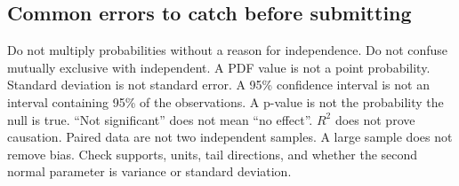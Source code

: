 \subsection*{Common errors to catch before submitting}
Do not multiply probabilities without a reason for independence. Do not
confuse mutually exclusive with independent. A PDF value is not a point
probability. Standard deviation is not standard error. A 95\% confidence
interval is not an interval containing 95\% of the observations. A p-value
is not the probability the null is true. ``Not significant'' does not mean
``no effect''. $R^2$ does not prove causation. Paired data are not two
independent samples. A large sample does not remove bias. Check supports,
units, tail directions, and whether the second normal parameter is variance
or standard deviation.

\clearpage
